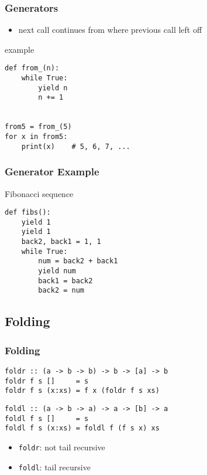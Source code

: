\documentclass[dvipsnames]{beamer}
\theoremstyle{plain}
\begin{document}
\begin{frame}[fragile]
  \frametitle{Generators}

  \begin{itemize}
    \item next call continues from where previous call left off
  \end{itemize}

  \begin{exampleblock}{example}
    \begin{lstlisting}
def from_(n):
    while True:
        yield n
        n += 1


from5 = from_(5)
for x in from5:
    print(x)    # 5, 6, 7, ...
    \end{lstlisting}
  \end{exampleblock}
\end{frame}

\begin{frame}[fragile]
  \frametitle{Generator Example}

  \begin{exampleblock}{Fibonacci sequence}
    \begin{lstlisting}
def fibs():
    yield 1
    yield 1
    back2, back1 = 1, 1
    while True:
        num = back2 + back1
        yield num
        back1 = back2
        back2 = num
    \end{lstlisting}
  \end{exampleblock}
\end{frame}

\lstset{language=Haskell}

\subsection{Folding}

\begin{frame}[fragile]
  \frametitle{Folding}

  \begin{lstlisting}
foldr :: (a -> b -> b) -> b -> [a] -> b
foldr f s []     = s
foldr f s (x:xs) = f x (foldr f s xs)
    \end{lstlisting}

    \begin{lstlisting}
foldl :: (a -> b -> a) -> a -> [b] -> a
foldl f s []     = s
foldl f s (x:xs) = foldl f (f s x) xs
  \end{lstlisting}

  \medskip
  \begin{itemize}
    \item \lstinline|foldr|: not tail recursive
    \item \lstinline|foldl|: tail recursive
  \end{itemize}
\end{frame}
\end{document}
